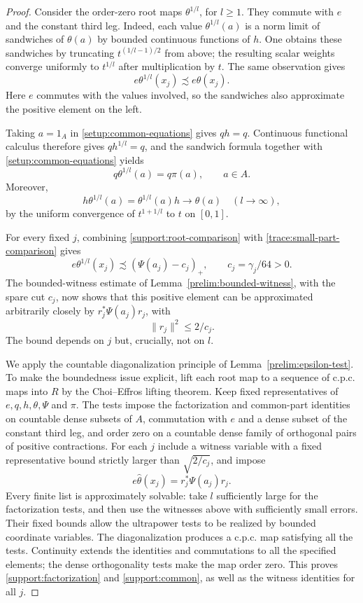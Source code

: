 \begin{proof}
Consider the order-zero root maps $\theta^{1/l}$, for $l\geq1$.
They commute with $e$ and the constant third leg.  Indeed, each value
$\theta^{1/l}(a)$ is a norm limit of sandwiches of $\theta(a)$ by
bounded continuous functions of $h$.  One obtains these sandwiches
by truncating $t^{(1/l-1)/2}$ from above; the resulting scalar weights
converge uniformly to $t^{1/l}$ after multiplication by $t$.
The same observation gives
\begin{equation}\label{support:root-comparison}
 e\theta^{1/l}(x_j)\precsim e\theta(x_j).
\end{equation}
Here $e$ commutes with the values involved, so the sandwiches also
approximate the positive element on the left.

Taking $a=1_A$ in \eqref{setup:common-equations} gives $qh=q$.  Continuous
functional calculus therefore gives $qh^{1/l}=q$, and the sandwich
formula together with \eqref{setup:common-equations} yields
\[
 q\theta^{1/l}(a)=q\pi(a),\qquad a\in A.
\]
Moreover,
\[
 h\theta^{1/l}(a)=\theta^{1/l}(a)h\longrightarrow\theta(a)
 \quad(l\longrightarrow\infty),
\]
by the uniform convergence of $t^{1+1/l}$ to $t$ on $[0,1]$.

For every fixed $j$, combining \eqref{support:root-comparison} with
\eqref{trace:small-part-comparison} gives
\[
 e\theta^{1/l}(x_j)\precsim(\Psi(a_j)-c_j)_+,
 \qquad c_j=\gamma_j/64>0.
\]
The bounded-witness estimate of Lemma~\ref{prelim:bounded-witness}, with the
spare cut $c_j$, now shows that this positive element can be
approximated arbitrarily closely by $r_j^*\Psi(a_j)r_j$, with
\begin{equation}\label{support:witness-bound}
 \|r_j\|^2\leq 2/c_j.
\end{equation}
The bound depends on $j$ but, crucially, not on $l$.

We apply the countable diagonalization principle of
Lemma~\ref{prelim:epsilon-test}.  To make the boundedness issue explicit,
lift each root map to a sequence of c.p.c. maps into $R$ by the
Choi--Effros lifting theorem.  Keep fixed representatives of
$e,q,h,\theta,\Psi$ and $\pi$.  The tests impose the factorization
and common-part identities on countable dense subsets of $A$,
commutation with $e$ and a dense subset of the constant third leg,
and order zero on a countable dense family of orthogonal pairs of
positive contractions.  For each $j$ include a witness variable with
a fixed representative bound strictly larger than
$\sqrt{2/c_j}$, and impose
\[
 e\widehat\theta(x_j)=r_j^*\Psi(a_j)r_j.
\]
Every finite list is approximately solvable: take $l$ sufficiently
large for the factorization tests, and then use the witnesses above
with sufficiently small errors.  Their fixed bounds allow the
ultrapower tests to be realized by bounded coordinate variables.
The diagonalization produces a c.p.c. map satisfying all the tests.
Continuity extends the identities and commutations to all the
specified elements; the dense orthogonality tests make the map
order zero.  This proves \eqref{support:factorization} and
\eqref{support:common}, as well as the witness identities for all $j$.


\end{proof}
